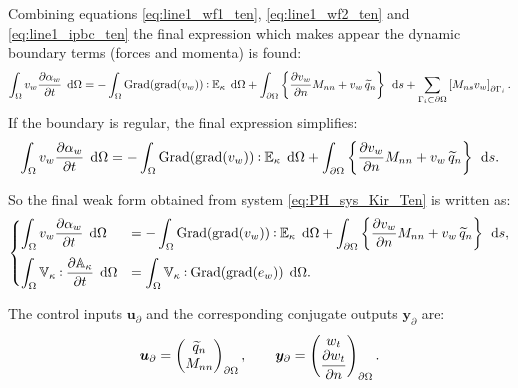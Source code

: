 \documentclass[11pt]{article}
\def\onedot{$\mathsurround0pt\ldotp$}
\def\cddot{%
	\mathbin{\vcenter{\baselineskip.67ex
			\hbox{\onedot}\hbox{\onedot}}%
}}
\begin{document}
	Combining equations \eqref{eq:line1_wf1_ten}, \eqref{eq:line1_wf2_ten} and \eqref{eq:line1_ipbc_ten} the final expression which makes appear the dynamic boundary terms (forces and momenta) is found:
	\begin{equation}
	\int_{\Omega} v_w \diffp{\alpha_w}{t} \, \d\Omega  =  -  \int_{\Omega} \mathrm{Grad}(\mathrm{grad}(v_w))  \cddot \mathbb{E}_{\kappa} \, \d\Omega  +  \int_{\partial \Omega} \left\{ \diffp{v_w}{n} M_{nn}  + v_w \, \widetilde{q}_n \right\}  \, \d{s}  + \sum_{\Gamma_{i} \subset \partial \Omega} \left[ M_{ns} v_w \right]_{\partial \Gamma_i}.
	\end{equation}
	If the boundary is regular, the final expression simplifies:  
	\begin{equation}
	\int_{\Omega} v_w \diffp{\alpha_w}{t}  \, \d\Omega =  -  \int_{\Omega} \mathrm{Grad}(\mathrm{grad}(v_w))  \cddot \mathbb{E}_{\kappa} \, \d\Omega +  \int_{\partial \Omega} \left\{ \diffp{v_w}{n} M_{nn}  + v_w \, \widetilde{q}_n \right\} \, \d{s}. 
	\end{equation}
	
	So the final weak form obtained from system \eqref{eq:PH_sys_Kir_Ten} is written as:
	\begin{equation}
	\label{eq:WF_Kir_Dyn}
	\begin{cases}
	\displaystyle\int_{\Omega} v_w \diffp{\alpha_w}{t} \, \d\Omega  &=  -  \displaystyle\int_{\Omega} \mathrm{Grad}(\mathrm{grad}(v_w))  \cddot \mathbb{E}_{\kappa} \, \d\Omega +  \displaystyle\int_{\partial \Omega} \left\{ \diffp{v_w}{n} M_{nn}  + v_w \, \widetilde{q}_n \right\}   \, \d{s},  \vspace{2mm}\\
	\displaystyle\int_{\Omega} \mathbb{V}_{\kappa} \cddot \diffp{\mathbb{A}_{\kappa}}{t} \, \d\Omega &= \displaystyle\int_{\Omega} \mathbb{V}_{\kappa} \cddot \mathrm{Grad}(\mathrm{grad}(e_w)) \, \d\Omega. 
	\end{cases}
	\end{equation}
	
	The control inputs $\bm{u}_\partial$ and the corresponding conjugate outputs $\bm{y}_\partial$ are:
	\[\bm{u}_\partial = 
	\begin{pmatrix}
	\widetilde{q}_n \\
	M_{nn} \\
	\end{pmatrix}_{\partial \Omega}, \qquad
	\bm{y}_\partial = 
	\begin{pmatrix}
	w_t \\
	\displaystyle \diffp{w_t}{n} \\
	\end{pmatrix}_{\partial \Omega}.
	\]
	
\end{document}
